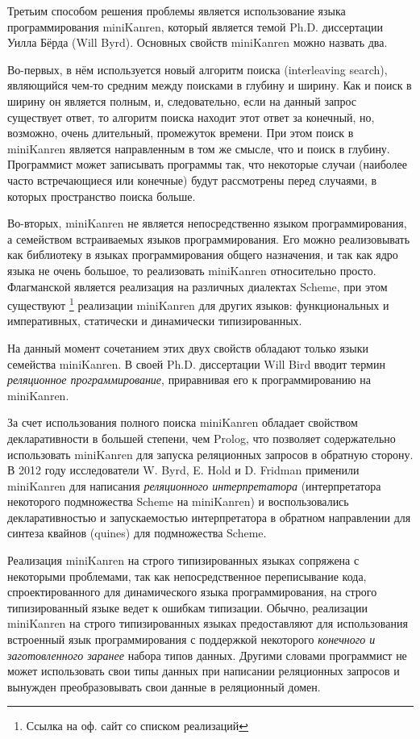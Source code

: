 Третьим способом решения проблемы является использование языка программирования miniKanren, который является темой Ph.D. диссертации Уилла Бёрда (Will Byrd). Основных свойств miniKanren можно назвать два.

Во-первых, в нём используется новый алгоритм поиска (interleaving search), являющийся чем-то средним между поисками в глубину и ширину. Как и поиск в ширину он является полным, и, следовательно, если на данный запрос существует ответ, то алгоритм поиска находит этот ответ за конечный, но, возможно, очень длительный, промежуток времени. При этом поиск в miniKanren является направленным в том же смысле, что и поиск в глубину. Программист может записывать программы так, что некоторые случаи (наиболее часто встречающиеся или конечные) будут рассмотрены перед случаями, в которых пространство поиска больше.

Во-вторых, miniKanren не является непосредственно языком программирования, а семейством встраиваемых языков программирования. Его можно реализовывать как библиотеку в языках программирования общего назначения, и так как ядро языка не очень большое, то реализовать miniKanren относительно просто. Флагманской является реализация на различных диалектах Scheme, при этом существуют \footnote{Ссылка на оф. сайт со списком реализаций} реализации miniKanren для других языков: функциональных и императивных, статически и динамически типизированных.

На данный момент сочетанием этих двух свойств обладают только языки семейства miniKanren. В своей Ph.D. диссертации Will Bird вводит термин \emph{реляционное программирование}, приравнивая его к программированию на miniKanren.

За счет использования полного поиска miniKanren обладает свойством декларативности в большей степени, чем Prolog, что позволяет содержательно использовать miniKanren для запуска реляционных запросов в обратную сторону. В 2012 году исследователи W. Byrd, E. Hold и D. Fridman применили miniKanren для написания \emph{реляционного интерпретатора} (интерпретатора некоторого подмножества Scheme на miniKanren) и воспользовались декларативностью и запускаемостью интерпретатора в обратном направлении для синтеза квайнов (quines) для подмножества Scheme.

Реализация miniKanren на строго типизированных языках сопряжена с некоторыми проблемами, так как непосредственное переписывание кода, спроектированного для динамического языка программирования, на строго типизированный языке ведет к ошибкам типизации. Обычно, реализации miniKanren на строго типизированных языках предоставляют для использования встроенный язык программирования с поддержкой некоторого \emph{конечного и заготовленного заранее} набора типов данных. Другими словами программист не может использовать свои типы данных при написании реляционных запросов и вынужден преобразовывать свои данные в реляционный домен.

